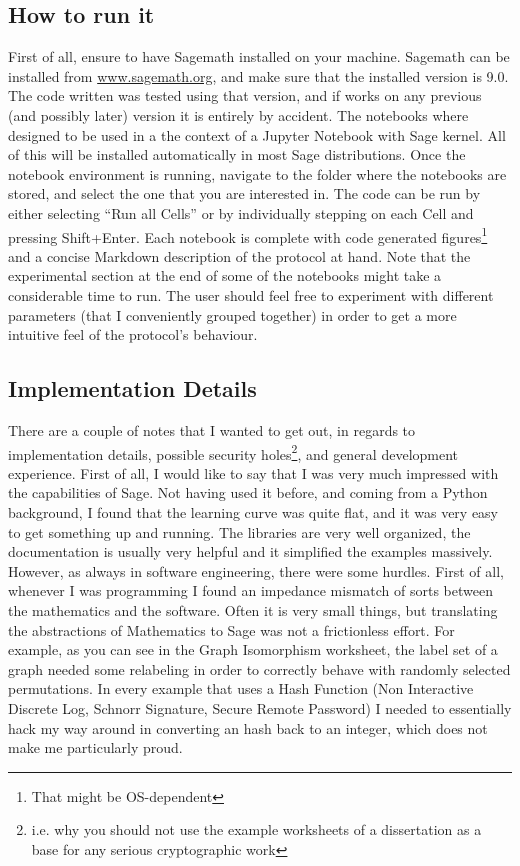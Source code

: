\documentclass{article}
\begin{document}
\subsection{How to run it}
First of all, ensure to have Sagemath installed on your machine.
Sagemath can be installed from \url{www.sagemath.org}, and make sure that the installed version is 9.0.
The code written was tested using that version, and if works on any previous (and possibly later) version it is entirely
by accident. The notebooks where designed to be used in a the context of a Jupyter Notebook with Sage kernel. All of this
will be installed automatically in most Sage distributions. Once the notebook environment is running, navigate to the
folder where the notebooks are stored, and select the one that you are interested in. The code can be run by either
selecting \enquote{Run all Cells} or by individually stepping on each Cell and pressing Shift+Enter. Each notebook is complete
with code generated figures\footnote{That might be OS-dependent} and a concise Markdown description of the protocol at hand.
Note that the experimental section at the end of some of the notebooks might take a considerable time to run.
The user should feel free to experiment with different parameters (that I conveniently grouped together) in order to
get a more intuitive feel of the protocol's behaviour.

\subsection{Implementation Details}
There are a couple of notes that I wanted to get out, in regards to implementation details, possible security holes\footnote{i.e. why you should not use the example worksheets of a dissertation as a base for any serious cryptographic
    work}, and general development experience. First of all, I would like to say that I was very much impressed with
the capabilities of Sage. Not having used it before, and coming from a Python background, I found that the learning
curve was quite flat, and it was very easy to get something up and running. The libraries are very well organized,
the documentation is usually very helpful and it simplified the examples massively. However, as always in software
engineering, there were some hurdles. First of all, whenever I was programming I found an impedance mismatch of
sorts between the mathematics and the software. Often it is very small things, but translating the abstractions of
Mathematics to Sage was not a frictionless effort. For example, as you can see in the Graph Isomorphism worksheet,
the label set of a graph needed some relabeling in order to correctly behave with randomly selected permutations.
In every example that uses a Hash Function (Non Interactive Discrete Log, Schnorr Signature, Secure Remote Password)
I needed to essentially hack my way around in converting an hash back to an integer,
which does not make me particularly proud.
\end{document}
